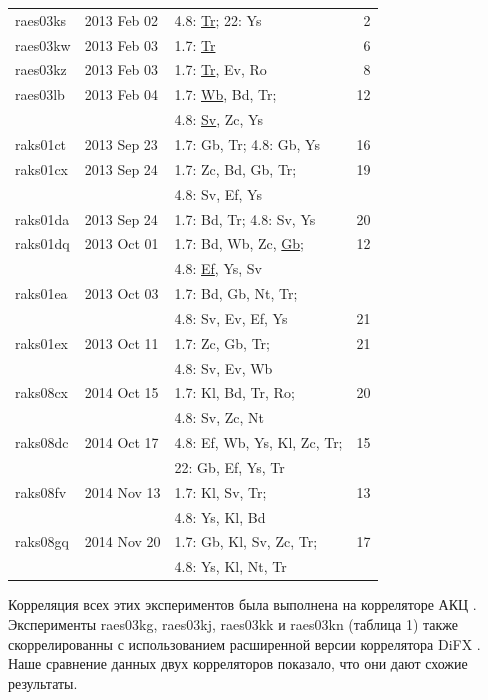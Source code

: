 \begin{table}
\begin{SingleSpace}
\begin{tabular}{lllr}
raes03ks & 2013 Feb 02 & 4.8: \underline{Tr}; 22: Ys & 2 \\
raes03kw & 2013 Feb 03 & 1.7: \underline{Tr} & 6 \\
raes03kz & 2013 Feb 03 & 1.7: \underline{Tr}, Ev, Ro & 8 \\
raes03lb & 2013 Feb 04 & 1.7: \underline{Wb}, Bd, Tr; & 12 \\
         &             & 4.8: \underline{Sv}, Zc, Ys &  \\
raks01ct & 2013 Sep 23 & 1.7: Gb, Tr; 4.8: Gb, Ys & 16 \\
raks01cx & 2013 Sep 24 & 1.7: Zc, Bd, Gb, Tr;& 19  \\
         &             & 4.8: Sv, Ef, Ys  & \\
raks01da & 2013 Sep 24 & 1.7: Bd, Tr; 4.8: Sv, Ys & 20  \\
raks01dq & 2013 Oct 01 & 1.7: Bd, Wb, Zc, \underline{Gb}; & 12 \\
         &             & 4.8: \underline{Ef}, Ys, Sv &  \\
raks01ea & 2013 Oct 03 & 1.7: Bd, Gb, Nt, Tr;   \\
         &             & 4.8: Sv, Ev, Ef, Ys & 21 \\
raks01ex & 2013 Oct 11 & 1.7: Zc, Gb, Tr; & 21  \\
         &             & 4.8: Sv, Ev, Wb  & \\
raks08cx & 2014 Oct 15 & 1.7: Kl, Bd, Tr, Ro; & 20  \\
         &             & 4.8: Sv, Zc, Nt  & \\
raks08dc & 2014 Oct 17 & 4.8: Ef, Wb, Ys, Kl, Zc, Tr; & 15  \\
         &             &  22: Gb, Ef, Ys, Tr  & \\
raks08fv & 2014 Nov 13 & 1.7: Kl, Sv, Tr; & 13  \\
         &             & 4.8: Ys, Kl, Bd  & \\
raks08gq & 2014 Nov 20 & 1.7: Gb, Kl, Sv, Zc, Tr; & 17  \\
         &             & 4.8: Ys, Kl, Nt, Tr & \\
\bottomrule
\end{tabular}
\end{SingleSpace}
\end{table}

Корреляция всех этих экспериментов была выполнена на корреляторе АКЦ \cite{Likhachev_2017}.
Эксперименты raes03kg, raes03kj, raes03kk и raes03kn (таблица 1) также скоррелированны с
использованием расширенной версии \cite{Bruni_2016} коррелятора DiFX \cite{Deller_2011}. Наше
сравнение данных двух корреляторов показало, что они дают схожие результаты.

